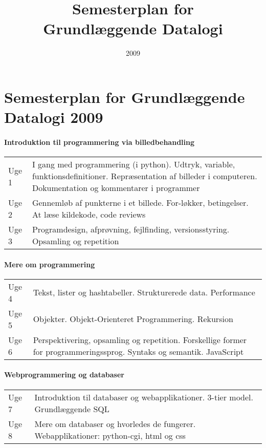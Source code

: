 \documentclass[12pt]{article}
\title{Semesterplan for \\Grundlæggende Datalogi}
\date{2009}
\begin{document}
\section*{Semesterplan for Grundlæggende Datalogi 2009}

\paragraph{Introduktion til programmering via billedbehandling}
\begin{center} \begin{tabular}{p{4em}p{30em}}
Uge 1&
I gang med programmering (i python).  Udtryk, variable, funktionsdefinitioner.  Repræsentation af billeder i computeren.  Dokumentation og kommentarer i programmer\\
Uge 2&Gennemløb af punkterne i et billede. For-løkker, betingelser. At læse kildekode, code reviews \\
Uge 3&Programdesign, afprøvning, fejlfinding, versionsstyring. Opsamling og repetition \\
\end{tabular}\end{center}

\paragraph{Mere om programmering}
\begin{center} \begin{tabular}{p{4em}p{30em}}
Uge 4&Tekst, lister og hashtabeller. Strukturerede data. Performance \\
Uge 5&Objekter. Objekt-Orienteret Programmering. Rekursion \\
Uge 6&Perspektivering, opsamling og repetition. Forskellige former for programmeringssprog. Syntaks og semantik. JavaScript\\
\end{tabular}\end{center}

\paragraph{Webprogrammering og databaser}
\begin{center}\begin{tabular}{p{4em}p{30em}}
Uge 7& Introduktion til databaser og webapplikationer. 3-tier model. Grundlæggende SQL \\
Uge 8& Mere om databaser og hvorledes de fungerer. Webapplikationer: python-cgi, html og css 
\end{tabular}\end{center}
\end{document}
